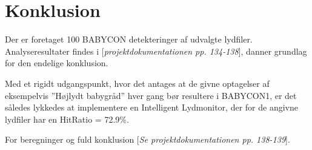 \newpage
\section{Konklusion}
Der er foretaget 100 BABYCON detekteringer af udvalgte lydfiler. Analyseresultater findes i [\textit{projektdokumentationen pp. 134-138}], danner grundlag for den endelige konklusion. 

Med et rigidt udgangspunkt, hvor det antages at de givne optagelser af eksempelvis
”Højlydt babygråd” hver gang bør resultere i BABYCON1, er det således lykkedes at implementere
en Intelligent Lydmonitor, der for de angivne lydfiler har en HitRatio = 72.9\%.

For beregninger og fuld konklusion [\textit{Se projektdokumentationen pp. 138-139}].



 
